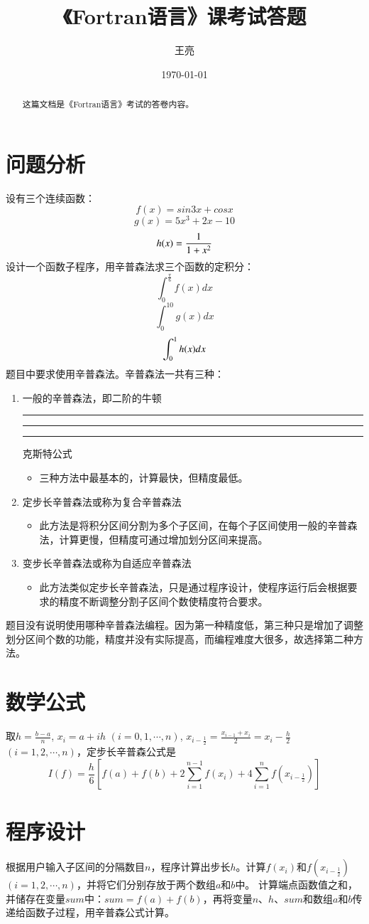 \documentclass[hyperref,UTF-8]{ctexart}
\title{\heiti 《Fortran语言》课考试答题}
\author{\kaishu 王亮}
\date{\today}
\newcommand{\cndash}{\rule{0.2em}{0pt}\rule[0.35em]{1.6em}{0.05em}\rule{0.2em}{0pt}}
\begin{document}
\maketitle
\tableofcontents
\begin{abstract}
这篇文档是《Fortran语言》考试的答卷内容。
\end{abstract}
\section{问题分析}
设有三个连续函数：
$$f(x)=sin3x+cosx$$
$$g(x)=5x^3+2x-10$$
$$h(x)=\vadjust{\vspace{10pt}}\frac{1}{1+x^2}$$
设计一个函数子程序，用辛普森法求三个函数的定积分：
$$\int_0^\frac{\pi}{6}f(x)dx$$
$$\int_0^{10}g(x)dx$$
$$\int_0^1h(x)\vadjust{\vspace{10pt}}dx$$
题目中要求使用辛普森法。辛普森法一共有三种：
\begin{enumerate}
\item 一般的辛普森法，即二阶的牛顿\cndash 克斯特公式
\begin{itemize}
\item 三种方法中最基本的，计算最快，但精度最低。
\end{itemize}
\item 定步长辛普森法或称为复合辛普森法
\begin{itemize}
\item 此方法是将积分区间分割为多个子区间，在每个子区间使用一般的辛普森法，计算更慢，但精度可通过增加划分区间来提高。
\end{itemize}
\item 变步长辛普森法或称为自适应辛普森法
\begin{itemize}
\item 此方法类似定步长辛普森法，只是通过程序设计，使程序运行后会根据要求的精度不断调整分割子区间个数使精度符合要求。
\end{itemize}
\end{enumerate}
题目没有说明使用哪种辛普森法编程。因为第一种精度低，第三种只是增加了调整划分区间个数的功能，精度并没有实际提高，而编程难度大很多，故选择第二种方法。
\section{数学公式}
取$h=\frac{b-a}{n}$, $x_i=a+ih$ $(i=0,1,\cdots,n)$, $x_{i-\frac{1}{2}}=\frac{x_{i-1}+x_i}{2}=x_i-\frac{h}{2}$ $(i=1,2,\cdots,n)$，定步长辛普森公式是
$$I(f)=\frac{h}{6}[f(a)+f(b)+2\sum_{i=1}^{n-1}f(x_i)+4\sum_{i=1}^{n}f(x_{i-\frac{1}{2}})]$$
\section{程序设计}
根据用户输入子区间的分隔数目$n$，程序计算出步长$h$。计算$f(x_i)$和$f(x_{i-\frac{1}{2}})$ $(i=1,2,\cdots,n)$，并将它们分别存放于两个数组$a$和$b$中。
计算端点函数值之和，并储存在变量$sum$中：$sum=f(a)+f(b)$，再将变量$n$、$h$、$sum$和数组$a$和$b$传递给函数子过程，用辛普森公式计算。
\end{document}
